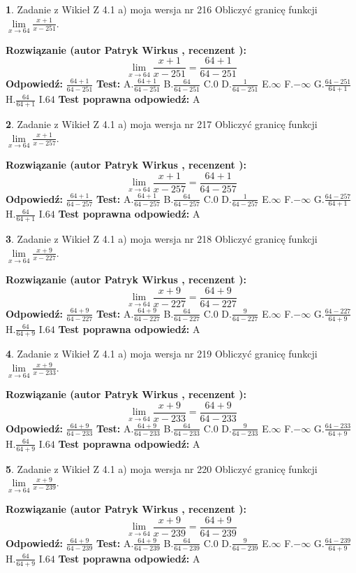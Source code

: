 \documentclass[12pt, a4paper]{article}
\theoremstyle{definition} %
\newtheorem{zad}{}
\newcommand{\zadStart}[1]{\begin{zad}#1\newline}
\newcommand{\zadStop}{\end{zad}}
\newcommand{\rozwStart}[2]{\noindent \textbf{Rozwiązanie (autor #1 , recenzent #2): }\newline}
\newcommand{\rozwStop}{\newline}
\newcommand{\odpStart}{\noindent \textbf{Odpowiedź:}\newline}
\newcommand{\odpStop}{\newline}
\newcommand{\testStart}{\noindent \textbf{Test:}\newline}
\newcommand{\testStop}{\newline}
\newcommand{\kluczStart}{\noindent \textbf{Test poprawna odpowiedź:}\newline}
\newcommand{\kluczStop}{\newline}
\begin{document}
\zadStart{Zadanie z Wikieł Z 4.1 a) moja wersja nr 216}
Obliczyć granicę funkcji $\lim\limits_{x\to64}\frac{x+1}{x-251}$.
\zadStop
\rozwStart{Patryk Wirkus}{}
$$\lim\limits_{x\to64}\frac{x+1}{x-251} = \frac{64+1}{64-251}$$
\rozwStop
\odpStart
$\frac{64+1}{64-251}$
\odpStop
\testStart
A.$\frac{64+1}{64-251}$
B.$\frac{64}{64-251}$
C.$0$
D.$\frac{1}{64-251}$
E.$\infty$
F.$-\infty$
G.$\frac{64-251}{64+1}$
H.$\frac{64}{64+1}$
I.$64$
\testStop
\kluczStart
A
\kluczStop



\zadStart{Zadanie z Wikieł Z 4.1 a) moja wersja nr 217}
Obliczyć granicę funkcji $\lim\limits_{x\to64}\frac{x+1}{x-257}$.
\zadStop
\rozwStart{Patryk Wirkus}{}
$$\lim\limits_{x\to64}\frac{x+1}{x-257} = \frac{64+1}{64-257}$$
\rozwStop
\odpStart
$\frac{64+1}{64-257}$
\odpStop
\testStart
A.$\frac{64+1}{64-257}$
B.$\frac{64}{64-257}$
C.$0$
D.$\frac{1}{64-257}$
E.$\infty$
F.$-\infty$
G.$\frac{64-257}{64+1}$
H.$\frac{64}{64+1}$
I.$64$
\testStop
\kluczStart
A
\kluczStop



\zadStart{Zadanie z Wikieł Z 4.1 a) moja wersja nr 218}
Obliczyć granicę funkcji $\lim\limits_{x\to64}\frac{x+9}{x-227}$.
\zadStop
\rozwStart{Patryk Wirkus}{}
$$\lim\limits_{x\to64}\frac{x+9}{x-227} = \frac{64+9}{64-227}$$
\rozwStop
\odpStart
$\frac{64+9}{64-227}$
\odpStop
\testStart
A.$\frac{64+9}{64-227}$
B.$\frac{64}{64-227}$
C.$0$
D.$\frac{9}{64-227}$
E.$\infty$
F.$-\infty$
G.$\frac{64-227}{64+9}$
H.$\frac{64}{64+9}$
I.$64$
\testStop
\kluczStart
A
\kluczStop



\zadStart{Zadanie z Wikieł Z 4.1 a) moja wersja nr 219}
Obliczyć granicę funkcji $\lim\limits_{x\to64}\frac{x+9}{x-233}$.
\zadStop
\rozwStart{Patryk Wirkus}{}
$$\lim\limits_{x\to64}\frac{x+9}{x-233} = \frac{64+9}{64-233}$$
\rozwStop
\odpStart
$\frac{64+9}{64-233}$
\odpStop
\testStart
A.$\frac{64+9}{64-233}$
B.$\frac{64}{64-233}$
C.$0$
D.$\frac{9}{64-233}$
E.$\infty$
F.$-\infty$
G.$\frac{64-233}{64+9}$
H.$\frac{64}{64+9}$
I.$64$
\testStop
\kluczStart
A
\kluczStop



\zadStart{Zadanie z Wikieł Z 4.1 a) moja wersja nr 220}
Obliczyć granicę funkcji $\lim\limits_{x\to64}\frac{x+9}{x-239}$.
\zadStop
\rozwStart{Patryk Wirkus}{}
$$\lim\limits_{x\to64}\frac{x+9}{x-239} = \frac{64+9}{64-239}$$
\rozwStop
\odpStart
$\frac{64+9}{64-239}$
\odpStop
\testStart
A.$\frac{64+9}{64-239}$
B.$\frac{64}{64-239}$
C.$0$
D.$\frac{9}{64-239}$
E.$\infty$
F.$-\infty$
G.$\frac{64-239}{64+9}$
H.$\frac{64}{64+9}$
I.$64$
\testStop
\kluczStart
A
\kluczStop
\end{document}
